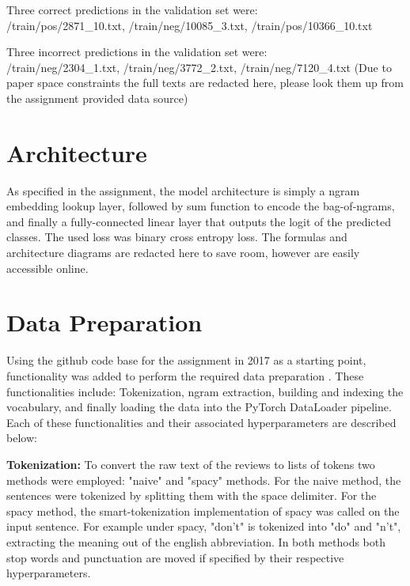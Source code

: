 \documentclass[a4paper,10pt]{article}
\begin{document}
\par
\justify
Three correct predictions in the validation set were: \\{/train/pos/2871\_10.txt}, {/train/neg/10085\_3.txt}, {/train/pos/10366\_10.txt}

\par
\justify
Three incorrect predictions in the validation set were: \\{/train/neg/2304\_1.txt}, {/train/neg/3772\_2.txt}, {/train/neg/7120\_4.txt} (Due to paper space constraints the full texts are redacted here, please look them up from the assignment provided data source)

\section{Architecture}
As specified in the assignment, the model architecture is simply a ngram embedding lookup layer, followed by sum function to encode the bag-of-ngrams, and finally a fully-connected linear layer that outputs the logit of the predicted classes. The used loss was binary cross entropy loss. The formulas and architecture diagrams are redacted here to save room, however are easily accessible online.

\section{Data Preparation}
\par
\justify
Using the github code base for the assignment in 2017 as a starting point, functionality was added to perform the required data preparation \cite{repo2017}. These functionalities include: Tokenization, ngram extraction, building and indexing the vocabulary, and finally loading the data into the PyTorch DataLoader pipeline. Each of these functionalities and their associated hyperparameters are described below:

\par
\justify
\textbf{Tokenization:} To convert the raw text of the reviews to lists of tokens two methods were employed: "naive" and "spacy" \cite{repospacy} methods. For the naive method, the sentences were tokenized by splitting them with the space delimiter. For the spacy method, the smart-tokenization implementation of spacy was called on the input sentence. For example under spacy, "don't" is tokenized into "do" and "n't", extracting the meaning out of the english abbreviation. In both methods both stop words and punctuation are moved if specified by their respective hyperparameters.
\end{document}

